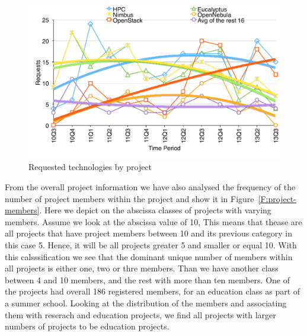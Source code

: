\begin{figure}[htb]
  \centering
    \includegraphics[width=1.0\textwidth]{images/trend-a.pdf}
  \caption{Requested technologies by project}\label{F:request-tech}
\end{figure}

From the overall project information we have also analysed the
frequency of the number of project members within the project and show
it in Figure~\ref{F:project-members}. Here we depict on the abscissa
classes of projects with varying members.  Assume we look at the
abscissa value of 10, This means that thease are all projects that
have project members between 10 and its previous category in this case
5. Hence, it will be all projects greater  5 and smaller or equal
10. With this calsssification  we see that the dominant unique number of
members within all projects is either one, two or thre members. Than
we have another class between 4 and 10 members, and the rest with more
than ten members. One of the projects had overall 186 registered
members, for an education class as part of a summer school. Looking at
the distribution of the members and associating them with reserach and
education projects, we find all projects with larger numbers of
projects to be education projects.


